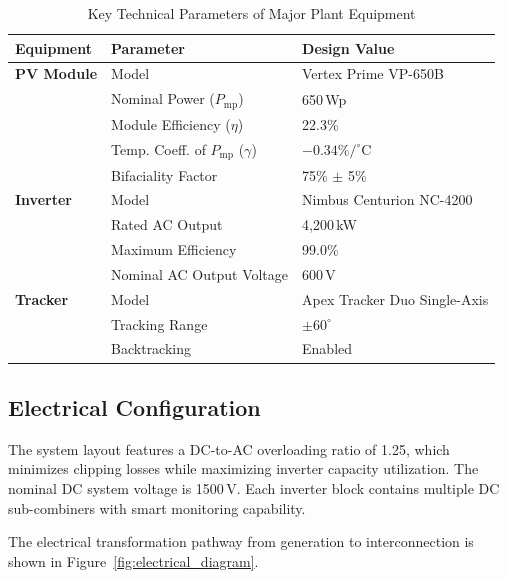 \begin{table}[htbp]
    \centering
    \caption{Key Technical Parameters of Major Plant Equipment}
    \label{tab:equipment_specs}
    \begin{tabularx}{\textwidth}{l X l}
        \toprule
        \textbf{Equipment} & \textbf{Parameter} & \textbf{Design Value} \\
        \midrule
        \textbf{PV Module} & Model & Vertex Prime VP-650B \\
         & Nominal Power ($P_{\text{mp}}$) & 650\,Wp \\
         & Module Efficiency ($\eta$) & 22.3\% \\
         & Temp. Coeff. of $P_{\text{mp}}$ ($\gamma$) & $-0.34\%/^\circ$C \\
         & Bifaciality Factor & 75\% $\pm$ 5\% \\
        \midrule
        \textbf{Inverter} & Model & Nimbus Centurion NC-4200 \\
         & Rated AC Output & 4,200\,kW \\
         & Maximum Efficiency & 99.0\% \\
         & Nominal AC Output Voltage & 600\,V \\
        \midrule
        \textbf{Tracker} & Model & Apex Tracker Duo Single-Axis \\
         & Tracking Range & $\pm 60^\circ$ \\
         & Backtracking & Enabled \\
        \bottomrule
    \end{tabularx}
\end{table}

\subsection{Electrical Configuration}
The system layout features a DC-to-AC overloading ratio of 1.25, which minimizes clipping losses while maximizing inverter capacity utilization. The nominal DC system voltage is 1500\,V. Each inverter block contains multiple DC sub-combiners with smart monitoring capability. 

The electrical transformation pathway from generation to interconnection is shown in Figure~\ref{fig:electrical_diagram}.

